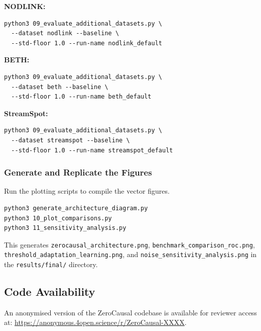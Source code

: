 \textbf{NODLINK:}
\begin{lstlisting}
python3 09_evaluate_additional_datasets.py \
  --dataset nodlink --baseline \
  --std-floor 1.0 --run-name nodlink_default
\end{lstlisting}

\textbf{BETH:}
\begin{lstlisting}
python3 09_evaluate_additional_datasets.py \
  --dataset beth --baseline \
  --std-floor 1.0 --run-name beth_default
\end{lstlisting}

\textbf{StreamSpot:}
\begin{lstlisting}
python3 09_evaluate_additional_datasets.py \
  --dataset streamspot --baseline \
  --std-floor 1.0 --run-name streamspot_default
\end{lstlisting}

\subsubsection{Generate and Replicate the Figures}
Run the plotting scripts to compile the vector figures.
\begin{lstlisting}
python3 generate_architecture_diagram.py
python3 10_plot_comparisons.py
python3 11_sensitivity_analysis.py
\end{lstlisting}
This generates \texttt{zerocausal\_architecture.png}, \texttt{benchmark\_comparison\_roc.png}, \texttt{threshold\_adaptation\_learning.png}, and \texttt{noise\_sensitivity\_analysis.png} in the \texttt{results/final/} directory.

\subsection{Code Availability}
An anonymised version of the ZeroCausal codebase is available for reviewer access at: \url{https://anonymous.4open.science/r/ZeroCausal-XXXX}.
